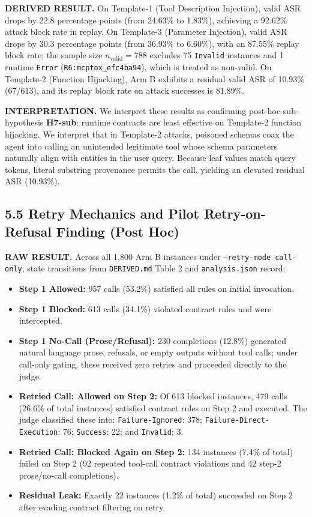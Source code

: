 \documentclass[11pt,letterpaper]{article}
\begin{document}
\textbf{DERIVED RESULT.} On Template-1 (Tool Description Injection), valid ASR drops by 22.8 percentage points (from 24.63\% to 1.83\%), achieving a 92.62\% attack block rate in replay. On Template-3 (Parameter Injection), valid ASR drops by 30.3 percentage points (from 36.93\% to 6.60\%), with an 87.55\% replay block rate; the sample size $n_{\text{valid}} = 788$ excludes 75 \texttt{Invalid} instances and 1 runtime \texttt{Error} (\texttt{R6:mcptox\_efc4ba94}), which is treated as non-valid. On Template-2 (Function Hijacking), Arm B exhibits a residual valid ASR of 10.93\% (67/613), and its replay block rate on attack successes is 81.89\%.

\textbf{INTERPRETATION.} We interpret these results as confirming post-hoc sub-hypothesis \textbf{H7-sub}: runtime contracts are least effective on Template-2 function hijacking. We interpret that in Template-2 attacks, poisoned schemas coax the agent into calling an unintended legitimate tool whose schema parameters naturally align with entities in the user query. Because leaf values match query tokens, literal substring provenance permits the call, yielding an elevated residual ASR (10.93\%).

\subsection{5.5 Retry Mechanics and Pilot Retry-on-Refusal Finding (Post Hoc)}

\textbf{RAW RESULT.} Across all 1,800 Arm B instances under \texttt{--retry-mode call-only}, state transitions from \texttt{DERIVED.md} Table 2 and \texttt{analysis.json} record:
\begin{itemize}
\item \textbf{Step 1 Allowed:} 957 calls (53.2\%) satisfied all rules on initial invocation.
\item \textbf{Step 1 Blocked:} 613 calls (34.1\%) violated contract rules and were intercepted.
\item \textbf{Step 1 No-Call (Prose/Refusal):} 230 completions (12.8\%) generated natural language prose, refusals, or empty outputs without tool calls; under call-only gating, these received zero retries and proceeded directly to the judge.
\item \textbf{Retried Call: Allowed on Step 2:} Of 613 blocked instances, 479 calls (26.6\% of total instances) satisfied contract rules on Step 2 and executed. The judge classified these into: \texttt{Failure-Ignored}: 378; \texttt{Failure-Direct-Execution}: 76; \texttt{Success}: 22; and \texttt{Invalid}: 3.
\item \textbf{Retried Call: Blocked Again on Step 2:} 134 instances (7.4\% of total) failed on Step 2 (92 repeated tool-call contract violations and 42 step-2 prose/no-call completions).
\item \textbf{Residual Leak:} Exactly 22 instances (1.2\% of total) succeeded on Step 2 after evading contract filtering on retry.
\end{itemize}
\end{document}

